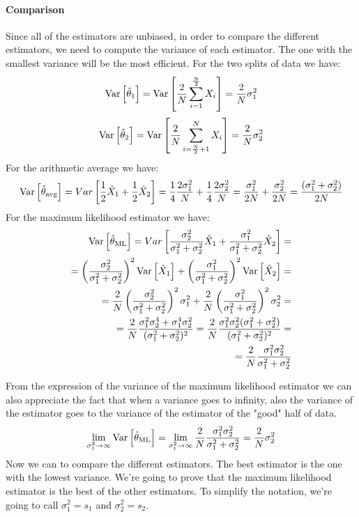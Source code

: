 \paragraph*{Comparison}
Since all of the estimators are unbiased, in order to compare the different estimators, we need to compute the variance of each estimator. The one with the smallest variance will be the most efficient. For the two splits of data we have:
\[
    \text{Var}\left[\hat \theta_1\right] = \text{Var}\left[\frac{2}{N} \sum_{i=1}^{\frac{N}{2}} X_i\right] = \frac{2}{N}\sigma_1^2
\]
\[
    \text{Var}\left[\hat \theta_2\right] = \text{Var}\left[\frac{2}{N} \sum_{i=\frac{N}{2} + 1}^{N} X_i\right] = \frac{2}{N}\sigma_2^2
\]
For the arithmetic average we have:
\[
    \text{Var}\left[\hat \theta_{\text{avg}}\right]=Var\left[\frac 12\hat X_1+\frac 12 \hat X_2\right]=\frac 14\frac{2\sigma_1^2}N+\frac 14 \frac{2\sigma_2^2}N=\frac{\sigma_1^2}{2N}+\frac{\sigma_2^2}{2N}= \frac{(\sigma_1^2+\sigma^2_2)}{2N}
\]
For the maximum likelihood estimator we have:
\begin{align*}
    \text{Var}\left[\hat{\theta}_{\text{ML}}\right] = Var\left[\frac{\sigma_2^2}{\sigma_1^2+\sigma_2^2}\hat X_1+\frac{\sigma_1^2}{\sigma_1^2+\sigma_2^2}\hat X_2\right]=                                     \\
    = \left(\frac{\sigma_2^2}{\sigma_1^2+\sigma_2^2}\right)^2 \text{Var}\left[\hat X_1\right]+\left(\frac{\sigma_1^2}{\sigma_1^2+\sigma_2^2}\right)^2 \text{Var}\left[\hat X_2\right] =                                       \\
    = \frac{2}{N} \left(\frac{\sigma_2^2}{\sigma_1^2+\sigma_2^2}\right)^2 \sigma_1^2 + \frac{2}{N} \left(\frac{\sigma_1^2}{\sigma_1^2+\sigma_2^2}\right)^2 \sigma_2^2 =                     \\
    = \frac{2}{N} \frac{\sigma_1^2\sigma_2^4+\sigma_1^4\sigma_2^2}{(\sigma_1^2+\sigma_2^2)^2} = \frac{2}{N} \frac{\sigma_1^2\sigma_2^2(\sigma_1^2+\sigma_2^2)}{(\sigma_1^2+\sigma_2^2)^2} = \\
    = \frac{2}{N} \frac{\sigma_1^2\sigma_2^2}{\sigma_1^2+\sigma_2^2}
\end{align*}

From the expression of the variance of the maximum likelihood estimator we can also appreciate the fact that when a variance goes to infinity, also the variance of the estimator goes to the variance of the estimator of the "good" half of data.
\[
    \lim_{\sigma_1^2 \to \infty} \var{\hat{\theta}_{\text{ML}}} = \lim_{\sigma_1^2 \to \infty} \frac{2}{N} \frac{\sigma_1^2\sigma_2^2}{\sigma_1^2+\sigma_2^2} = \frac{2}{N} \sigma_2^2
\]
Now we can to compare the different estimators. The best estimator is the one with the lowest variance. We're going to prove that the maximum likelihood estimator is the best of the other estimators. To simplify the notation, we're going to call $\sigma_1^2 = s_1$ and $\sigma_2^2 = s_2$.


